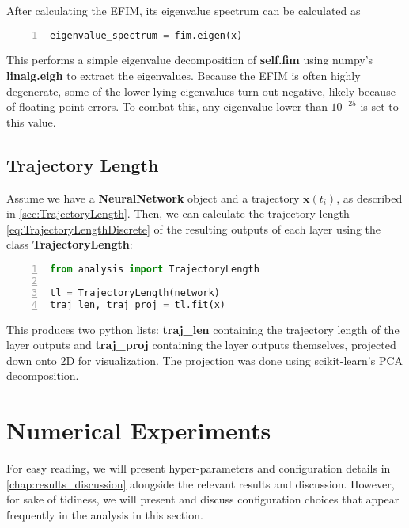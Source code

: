 After calculating the EFIM, its eigenvalue spectrum can be calculated as 

\begin{lstlisting}[language=python, numbers=left]
eigenvalue_spectrum = fim.eigen(x)
\end{lstlisting}
This performs a simple eigenvalue decomposition of \textbf{self.fim} using numpy's \textbf{linalg.eigh} to extract the eigenvalues. Because the EFIM is often highly degenerate, some of the lower lying eigenvalues turn out negative, likely because of floating-point errors. To combat this, any eigenvalue lower than $10^{-25}$ is set to this value. 

\subsection{Trajectory Length}\label{sec:TrajectoryLengthImplement}
Assume we have a \textbf{NeuralNetwork} object and a trajectory $\boldsymbol{x}(t_i)$, as described in \cref{sec:TrajectoryLength}. Then, we can calculate the trajectory length \cref{eq:TrajectoryLengthDiscrete} of the resulting outputs of each layer using the class \textbf{TrajectoryLength}:

\begin{lstlisting}[language=python, numbers=left]
from analysis import TrajectoryLength

tl = TrajectoryLength(network)
traj_len, traj_proj = tl.fit(x)
\end{lstlisting}
This produces two python lists: \textbf{traj\_len} containing the trajectory length of the layer outputs and \textbf{traj\_proj} containing the layer outputs themselves, projected down onto 2D for visualization. The projection was done using scikit-learn's \cite{scikit-learn} PCA decomposition. 


\section{Numerical Experiments}\label{sec:Numerical Experiments}
For easy reading, we will present hyper-parameters and configuration details in \cref{chap:results_discussion} alongside the relevant results and discussion. However, for sake of tidiness, we will present and discuss configuration choices that appear frequently in the analysis in this section.

